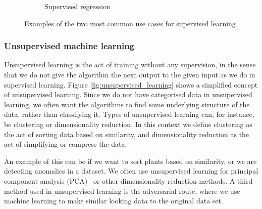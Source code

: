 \begin{figure}
\begin{subfigure}[t]{0.34\textwidth}
         \caption{Supervised regression}
         \label{fig:supervised_regression}
     \end{subfigure}
        \caption{Examples of the two most common use cases for supervised learning}
        \label{fig:supervised_learning}
\end{figure}
\FloatBarrier
\subsubsection{Unsupervised machine learning}
Unsupervised learning is the act of training without any supervision, in the sense that we do not give the algorithm the next output to the given input as we do in supervised learning. Figure \ref{fig:unsupervised_learning} shows a simplified concept of unsupervised learning.
Since we do not have categorised data in unsupervised learning, we often want the algorithms to find some underlying structure of the data, rather than classifying it.
Types of unsupervised learning can, for instance, be clustering or dimensionality reduction. In this context we define clustering as the act of sorting data based on similarity, and dimensionality reduction as the act of simplifying or compress the data.

An example of this can be if we want to sort plants based on similarity, or we are detecting anomalies in a dataset. We often use unsupervised learning for principal component analysis (PCA)~\cite{doi:10.1080/14786440109462720} or other dimensionality reduction methods.
A third method used in unsupervised learning is the adversarial route, where we use machine learning to make similar looking data to the original data set. 

